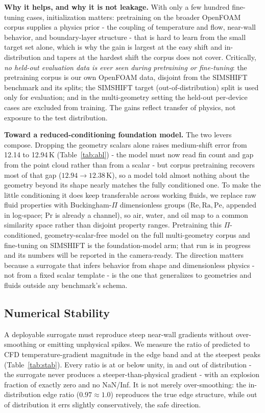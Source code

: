 \documentclass[conference]{IEEEtran}
\begin{document}
\textbf{Why it helps, and why it is not leakage.} With only a few hundred fine-tuning cases,
initialization matters: pretraining on the broader OpenFOAM corpus supplies a physics prior - the
coupling of temperature and flow, near-wall behavior, and boundary-layer structure - that is hard to
learn from the small target set alone, which is why the gain is largest at the easy shift and
in-distribution and tapers at the hardest shift the corpus does not cover. Critically, \emph{no
held-out evaluation data is ever seen during pretraining or fine-tuning}: the pretraining corpus is our
own OpenFOAM data, disjoint from the SIMSHIFT benchmark and its splits; the SIMSHIFT target
(out-of-distribution) split is used only for evaluation; and in the multi-geometry setting the held-out
per-device cases are excluded from training. The gains reflect transfer of physics, not exposure to
the test distribution.

\textbf{Toward a reduced-conditioning foundation model.} The two levers compose. Dropping the geometry
scalars alone raises medium-shift error from 12.14 to 12.94\,K (Table~\ref{tab:abl}) - the model must now
read fin count and gap from the point cloud rather than from a scalar - but corpus pretraining recovers most
of that gap ($12.94\!\to\!12.38$\,K), so a model told almost nothing about the geometry beyond its shape
nearly matches the fully conditioned one. To make the little conditioning it does keep transferable across
working fluids, we replace raw fluid properties with Buckingham-$\Pi$ dimensionless groups
($\mathrm{Re},\mathrm{Ra},\mathrm{Pe}$, appended in log-space; $\mathrm{Pr}$ is already a channel), so air,
water, and oil map to a common similarity space rather than disjoint property ranges. Pretraining this
$\Pi$-conditioned, geometry-scalar-free model on the full multi-geometry corpus and fine-tuning on SIMSHIFT
is the foundation-model arm; that run is in progress and its numbers will be reported in the camera-ready.
The direction matters because a surrogate that infers behavior from shape and dimensionless physics - not
from a fixed scalar template - is the one that generalizes to geometries and fluids outside any benchmark's
schema.

\subsection{Numerical Stability}\label{sec:stab}
A deployable surrogate must reproduce steep near-wall gradients without over-smoothing or emitting
unphysical spikes. We measure the ratio of predicted to CFD temperature-gradient magnitude in the edge
band and at the steepest peaks (Table~\ref{tab:stab}). Every ratio is at or below unity, in and out of
distribution - the surrogate never produces a steeper-than-physical gradient - with an explosion
fraction of exactly zero and no NaN/Inf. It is not merely over-smoothing: the in-distribution edge
ratio ($0.97\approx1.0$) reproduces the true edge structure, while out of distribution it errs
slightly conservatively, the safe direction.
\end{document}
